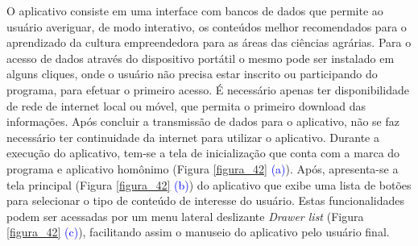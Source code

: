 O aplicativo consiste em uma interface com bancos de dados que permite ao usuário averiguar, de modo interativo, os conteúdos melhor recomendados para o aprendizado da cultura empreendedora para as áreas das ciências agrárias. 
Para o acesso de dados através do dispositivo portátil o mesmo pode ser instalado em alguns cliques, onde o usuário não precisa estar inscrito ou participando do programa, para efetuar o primeiro acesso. É necessário apenas ter disponibilidade de rede de internet local ou móvel, que permita o primeiro download das informações. Após concluir a transmissão de dados para o aplicativo, não se faz necessário ter continuidade da internet para utilizar o aplicativo. 
Durante a execução do aplicativo, tem-se a tela de inicialização que conta com a marca do programa e aplicativo homônimo (Figura \ref{figura_42} \textcolor{blue}{(a)}). 
Após, apresenta-se a tela principal (Figura \ref{figura_42} \textcolor{blue}{(b)}) do aplicativo que exibe uma lista de botões para selecionar o tipo de conteúdo de interesse do usuário. Estas funcionalidades podem ser acessadas por um menu lateral deslizante \textit{Drawer list} (Figura \ref{figura_42} \textcolor{blue}{(c)}), facilitando assim o manuseio do aplicativo pelo usuário final. 


